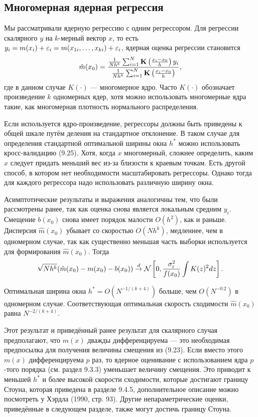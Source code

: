 \subsection{Многомерная ядерная регрессия}

Мы рассматривали ядерную регрессию с одним регрессором. Для регрессии скалярного $y$ на $k$-мерный вектор $x$, то есть $y_i = m(x_i) + \varepsilon_i = m(x_{1i}, \dots, x_{ki}) + \varepsilon_i$, ядерная оценка регрессии становится
\[
\hat{m}(x_0) = \frac{\frac{1}{Nh^k}\sum_{i=1}^N {\bf{K}} \left( \frac{x_i - x_0}{h} \right)y_i}{\frac{1}{Nh^k}\sum_{i=1}^N {\bf{K}} \left( \frac{x_i - x_0}{h} \right)},
\]
где в данном случае $K(\cdot)$ --- многомерное ядро. Часто $K(\cdot)$ обозначает произведение $k$ одномерных ядер, хотя можно использовать многомерные ядра такие, как многомерная плотность нормального распределения.

Если используется ядро-произведение, регрессоры должны быть приведены к общей шкале путём деления на стандартное отклонение. В таком случае для определения стандартной оптимальной ширины окна $h^*$ можно использовать кросс-валидацию (9.25). Хотя, когда $x$ многомерный, сложнее определить, каким $x$ следует придать меньший вес из-за близости к краевым точкам. Есть другой способ, в котором нет необходимости масштабировать регрессоры. Однако тогда для каждого регрессора надо использовать различную ширину окна.

Асимптотические результаты и выражения аналогичны тем, что были рассмотрены ранее, так как оценка снова является локальным средним $y_i$. Смещение $b(x_0)$ снова имеет порядок малости $O(h^2)$, как и раньше. Дисперсия $\hat{m}(x_0)$ убывает со скоростью $O(Nh^k)$, медленнее, чем в одномерном случае, так как существенно меньшая часть выборки используется для формирования $\hat{m}(x_0)$. Тогда
\[
\sqrt{Nh^k}(\hat{m}(x_0) - m(x_0) - b(x_0)) \stackrel{d}{\rightarrow} \mathcal{N}\left[ 0, \frac{\sigma_{\varepsilon}^2}{f(x_0)}\int K(z)^2dz \right].
\]

Оптимальная ширина окна  $h^* = O(N^{-1/(k+4)})$ больше, чем $O(N^{-0.2})$ в одномерном случае. Соответствующая оптимальная скорость сходимости $\hat{m}(x_0)$ равна $N^{-2/(k+4)}$.

Этот результат и приведённый ранее результат для скалярного случая предполагают, что $m(x)$ дважды дифференцируема --- это необходимая предпосылка для получения величины смещения из (9.23). Если вместо этого $m(x)$ дифференцируема $p$ раз, то ядерное оценивание с использованием ядра $p$-того порядка (см. раздел 9.3.3) уменьшает величину смещения. Это приводит к меньшей $h^*$ и более высокой скорости сходимости, которые достигают границу Стоуна, которая приведена в разделе 9.4.5, дополнительное описание можно посмотреть у Хэрдла (1990, стр. 93). Другие непараметрические оценки, приведённые в следующем разделе, также могут достичь границу Стоуна.

